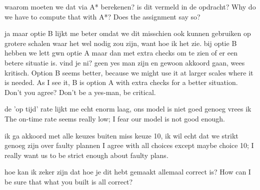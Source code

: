 \documentclass[11pt,a4paper]{article}
\begin{document}
  {waarom moeten we dat via A* berekenen? is dit vermeld in de opdracht?}
  {Why do we have to compute that with A*? Does the assignment say so?}

  {ja maar optie B lijkt me beter omdat we dit misschien ook kunnen gebruiken op grotere schalen waar het wel nodig zou zijn, want hoe ik het zie. bij optie B hebben we lett gwn optie A maar dan met extra checks om te zien of er een betere situatie is. vind je ni? geen yes man zijn en gewoon akkoord gaan, wees kritisch.}
  {Option B seems better, because we might use it at larger scales where it is needed. As I see it, B is option A with extra checks for a better situation. Don't you agree? Don't be a yes-man, be critical.}

  {de 'op tijd' rate lijkt me echt enorm laag, ons model is niet goed genoeg vrees ik}
  {The on-time rate seems really low; I fear our model is not good enough.}

  {ik ga akkoord met alle keuzes buiten miss keuze 10, ik wil echt dat we strikt genoeg zijn over faulty plannen}
  {I agree with all choices except maybe choice 10; I really want us to be strict enough about faulty plans.}

  {hoe kan ik zeker zijn dat hoe je dit hebt gemaakt allemaal correct is?}
  {How can I be sure that what you built is all correct?}
\end{document}
